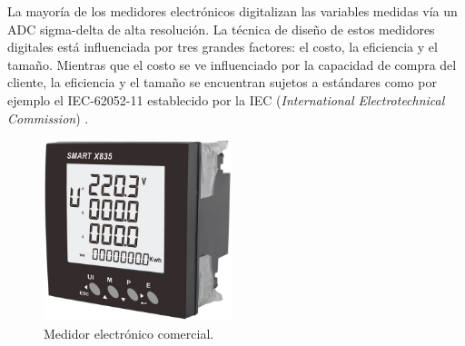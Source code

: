 



La mayoría de los medidores electrónicos digitalizan las variables medidas vía un ADC sigma-delta  de alta resolución. La técnica de diseño de estos medidores digitales está influenciada por tres grandes factores: el costo, la eficiencia y el tamaño. Mientras que el costo se ve influenciado por la capacidad de compra del cliente, la eficiencia y el tamaño se encuentran sujetos a estándares como por ejemplo el IEC-62052-11 establecido por la IEC (\textit{International Electrotechnical Commission}) \cite{articleDM}.


\begin{figure}[h]
	\centering
	\includegraphics[width=55mm,keepaspectratio]{Figures/3931_1.png}
	\caption{Medidor electrónico comercial\protect\footnotemark .}
	\label{fig:texmaker}
\end{figure}

